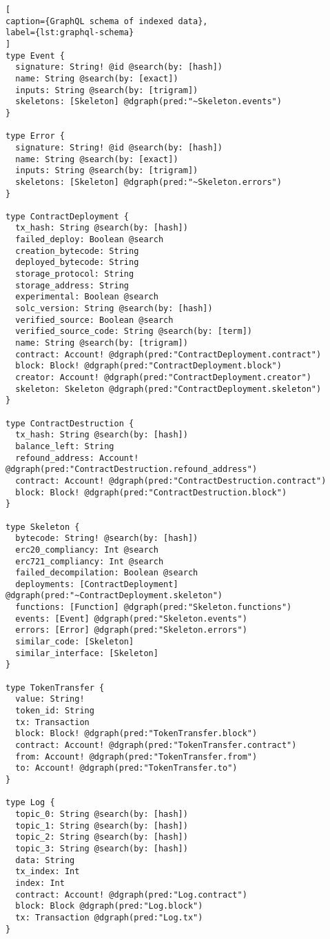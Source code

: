 \begin{lstlisting}[
caption={GraphQL schema of indexed data},
label={lst:graphql-schema}
]
type Event {
  signature: String! @id @search(by: [hash])
  name: String @search(by: [exact])
  inputs: String @search(by: [trigram])
  skeletons: [Skeleton] @dgraph(pred:"~Skeleton.events")
}

type Error {
  signature: String! @id @search(by: [hash])
  name: String @search(by: [exact])
  inputs: String @search(by: [trigram])
  skeletons: [Skeleton] @dgraph(pred:"~Skeleton.errors")
}

type ContractDeployment {
  tx_hash: String @search(by: [hash])
  failed_deploy: Boolean @search
  creation_bytecode: String
  deployed_bytecode: String
  storage_protocol: String
  storage_address: String
  experimental: Boolean @search
  solc_version: String @search(by: [hash])
  verified_source: Boolean @search
  verified_source_code: String @search(by: [term])
  name: String @search(by: [trigram])
  contract: Account! @dgraph(pred:"ContractDeployment.contract")
  block: Block! @dgraph(pred:"ContractDeployment.block")
  creator: Account! @dgraph(pred:"ContractDeployment.creator")
  skeleton: Skeleton @dgraph(pred:"ContractDeployment.skeleton")
}

type ContractDestruction {
  tx_hash: String @search(by: [hash])
  balance_left: String
  refound_address: Account! @dgraph(pred:"ContractDestruction.refound_address")
  contract: Account! @dgraph(pred:"ContractDestruction.contract")
  block: Block! @dgraph(pred:"ContractDestruction.block")
}

type Skeleton {
  bytecode: String! @search(by: [hash])
  erc20_compliancy: Int @search
  erc721_compliancy: Int @search
  failed_decompilation: Boolean @search
  deployments: [ContractDeployment] @dgraph(pred:"~ContractDeployment.skeleton")
  functions: [Function] @dgraph(pred:"Skeleton.functions")
  events: [Event] @dgraph(pred:"Skeleton.events")
  errors: [Error] @dgraph(pred:"Skeleton.errors")
  similar_code: [Skeleton]
  similar_interface: [Skeleton]
}

type TokenTransfer {
  value: String!
  token_id: String
  tx: Transaction
  block: Block! @dgraph(pred:"TokenTransfer.block")
  contract: Account! @dgraph(pred:"TokenTransfer.contract")
  from: Account! @dgraph(pred:"TokenTransfer.from")
  to: Account! @dgraph(pred:"TokenTransfer.to")
}

type Log {
  topic_0: String @search(by: [hash])
  topic_1: String @search(by: [hash])
  topic_2: String @search(by: [hash])
  topic_3: String @search(by: [hash])
  data: String 
  tx_index: Int
  index: Int
  contract: Account! @dgraph(pred:"Log.contract")
  block: Block @dgraph(pred:"Log.block")
  tx: Transaction @dgraph(pred:"Log.tx")
}
\end{lstlisting}

